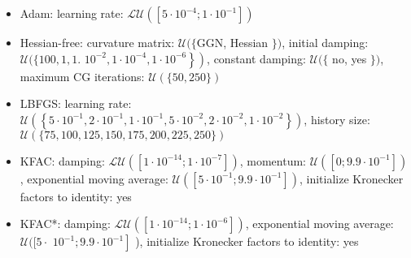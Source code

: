 \documentclass[10pt]{article}
\begin{document}
\begin{itemize}
  \item Adam: learning rate: $\mathcal{L U}\left(\left[5 \cdot 10^{-4} ; 1 \cdot 10^{-1}\right]\right)$
  \item Hessian-free: curvature matrix: $\mathcal{U}(\{\mathrm{GGN}$, Hessian $\})$, initial damping: $\mathcal{U}(\{100,1,1$. $\left.\left.10^{-2}, 1 \cdot 10^{-4}, 1 \cdot 10^{-6}\right\}\right)$, constant damping: $\mathcal{U}(\{$ no, yes $\})$, maximum CG iterations: $\mathcal{U}(\{50,250\})$
  \item LBFGS: learning rate: $\mathcal{U}\left(\left\{5 \cdot 10^{-1}, 2 \cdot 10^{-1}, 1 \cdot 10^{-1}, 5 \cdot 10^{-2}, 2 \cdot 10^{-2}, 1 \cdot 10^{-2}\right\}\right)$, history size: $\mathcal{U}(\{75,100,125,150,175,200,225,250\})$
  \item KFAC: damping: $\mathcal{L U}\left(\left[1 \cdot 10^{-14} ; 1 \cdot 10^{-7}\right]\right)$, momentum: $\mathcal{U}\left(\left[0 ; 9.9 \cdot 10^{-1}\right]\right)$, exponential moving average: $\mathcal{U}\left(\left[5 \cdot 10^{-1} ; 9.9 \cdot 10^{-1}\right]\right)$, initialize Kronecker factors to identity: yes
  \item KFAC*: damping: $\mathcal{L U}\left(\left[1 \cdot 10^{-14} ; 1 \cdot 10^{-6}\right]\right)$, exponential moving average: $\mathcal{U}([5 \cdot$ $\left.10^{-1} ; 9.9 \cdot 10^{-1}\right]$ ), initialize Kronecker factors to identity: yes
\end{itemize}
\end{document}
